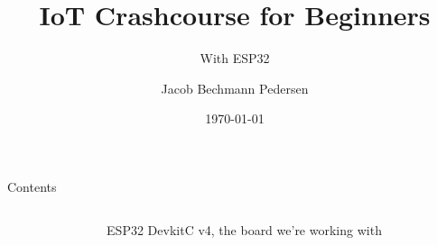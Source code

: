 \documentclass[aspectratio=169]{beamer}
\title{IoT Crashcourse for Beginners}
\subtitle{With ESP32}
\author{Jacob Bechmann Pedersen}
\institute{Bechmann Engineering ApS}
\date{\today}
\begin{document}
\begin{frame}
	\titlepage
\end{frame}

\begin{frame}{Contents}
	\begin{columns}
	\begin{column}{0.6\textwidth}
		\begin{fitBox}
			\tableofcontents{}
		\end{fitBox}
	\end{column}
	\begin{column}{0.4\textwidth}
		\centering
		\begin{figure}
  			
  			\caption{ESP32 DevkitC v4, the board we're working with}
  			\label{fig:esp32}
		\end{figure}
	\end{column}
	\end{columns}	
\end{frame}
\end{document}
